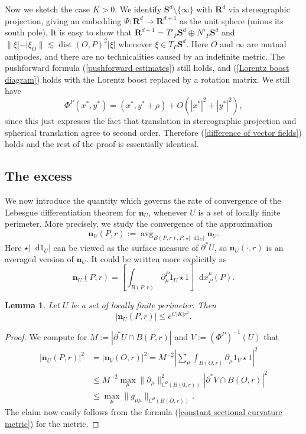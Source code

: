 \documentclass[reqno,11pt]{amsart}
\newcommand{\RR}{\mathbf{R}}
\newcommand{\Sph}{\mathbf S}
\DeclareMathOperator{\avg}{avg}
\newcommand*\dif{\mathop{}\!\mathrm{d}}
\DeclareMathOperator{\dist}{dist}
\newcommand{\normal}{\mathbf n}
\newtheorem{lemma}[theorem]{Lemma}
\theoremstyle{definition}
\numberwithin{equation}{section}
\begin{document}
Now we sketch the case $K > 0$.
We identify $\Sph^d \setminus \{\infty\}$ with $\RR^d$ via stereographic projection, giving an embedding $\Psi: \RR^d \to \RR^{d + 1}$ as the unit sphere (minus its south pole).
It is easy to show that $\RR^{d + 1} = T'_P \Sph^d \oplus N'_P \Sph^d$ and $\|\xi| - |\xi_O\| \lesssim \dist(O, P)^2 |\xi|$ whenever $\xi \in T_P \Sph^d$.
Here $O$ and $\infty$ are mutual antipodes, and there are no technicalities caused by an indefinite metric.
The pushforward formula (\ref{pushforward estimates}) still holds, and (\ref{Lorentz boost diagram}) holds with the Lorentz boost replaced by a rotation matrix.
We still have
$$\Phi^P(x^*, y^*) = (x^*, y^* + \rho) + O(|x^*|^2 + |y^*|^2),$$
since this just expresses the fact that translation in stereographic projection and spherical translation agree to second order.
Therefore (\ref{difference of vector fields}) holds and the rest of the proof is essentially identical.


\subsection{The excess}
We now introduce the quantity which governs the rate of convergence of the Lebesgue differentiation theorem for $\normal_U$, whenever $U$ is a set of locally finite perimeter.
More precisely, we study the convergence of the approximation
$$\normal_U(P, r) := \avg_{B(P, r), P, \star |\dif 1_U|} \normal_U.$$
Here $\star |\dif 1_U|$ can be viewed as the surface measure of $\partial^* U$, so $\normal_U(\cdot, r)$ is an averaged version of $\normal_U$.
It could be written more explicitly as
$$\normal_U(P, r) = \left[\int_{B(P, r)} \partial_\mu^P 1_U \star 1\right] \dif x_P^\mu(P).$$

\begin{lemma}\label{gauge invariance of the normal}
Let $U$ be a set of locally finite perimeter. Then
$$|\normal_U(P, r)| \leq e^{C|K|r^2}.$$
\end{lemma}
\begin{proof}
We compute for $M := |\partial^* U \cap B(P, r)|$ and $V := (\Phi^P)^{-1}(U)$ that
\begin{align*}
|\normal_U(P, r)|^2 &= |\normal_V(O, r)|^2 = M^{-2} \left|\sum_\mu \int_{B(O, r)} \partial_\mu 1_V \star 1\right|^2 \\
&\leq M^{-2} \max_\mu \|\partial_\mu\|_{C^0(B(0, r))}^2 |\partial^* V \cap B(O, r)|^2 \\
&\leq \max_\mu \|g_{\mu\mu}\|_{C^0(B(O, r))}.
\end{align*}
The claim now easily follows from the formula (\ref{constant sectional curvature metric}) for the metric.
\end{proof}
\end{document}

